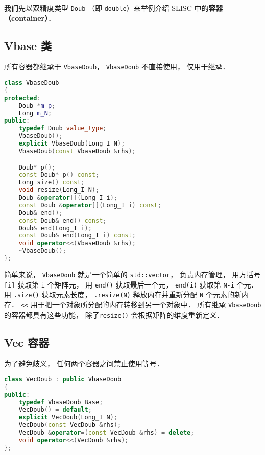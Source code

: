 
\begin{issues}
\issueDraft
\end{issues}


我们先以双精度类型 \verb|Doub| （即 \verb|double|）来举例介绍 SLISC 中的\textbf{容器（container）}．

\subsection{Vbase 类}
所有容器都继承于 \verb|VbaseDoub|， \verb|VbaseDoub| 不直接使用， 仅用于继承．
\begin{lstlisting}[language=cpp]
class VbaseDoub
{
protected:
    Doub *m_p;
    Long m_N;
public:
    typedef Doub value_type;
    VbaseDoub();
    explicit VbaseDoub(Long_I N);
    VbaseDoub(const VbaseDoub &rhs);

    Doub* p();
    const Doub* p() const;
    Long size() const;
    void resize(Long_I N);
    Doub &operator[](Long_I i);
    const Doub &operator[](Long_I i) const;
    Doub& end();
    const Doub& end() const;
    Doub& end(Long_I i);
    const Doub& end(Long_I i) const;
    void operator<<(VbaseDoub &rhs);
    ~VbaseDoub();
};
\end{lstlisting}

简单来说， \verb|VbaseDoub| 就是一个简单的 \verb|std::vector|， 负责内存管理， 用方括号 \verb|[i]| 获取第 \verb|i| 个矩阵元， 用 \verb|end()| 获取最后一个元， \verb|end(i)| 获取第 \verb|N-i| 个元． 用 \verb|.size()| 获取元素长度， \verb|.resize(N)| 释放内存并重新分配 \verb|N| 个元素的新内存． \verb|<<| 用于把一个对象所分配的内存转移到另一个对象中． 所有继承 \verb|VbaseDoub| 的容器都具有这些功能， 除了\verb|resize()| 会根据矩阵的维度重新定义．

\subsection{Vec 容器}
为了避免歧义， 任何两个容器之间禁止使用等号．
\begin{lstlisting}[language=cpp]
class VecDoub : public VbaseDoub
{
public:
    typedef VbaseDoub Base;
    VecDoub() = default;
    explicit VecDoub(Long_I N);
    VecDoub(const VecDoub &rhs);
    VecDoub &operator=(const VecDoub &rhs) = delete;
    void operator<<(VecDoub &rhs);
};
\end{lstlisting}

